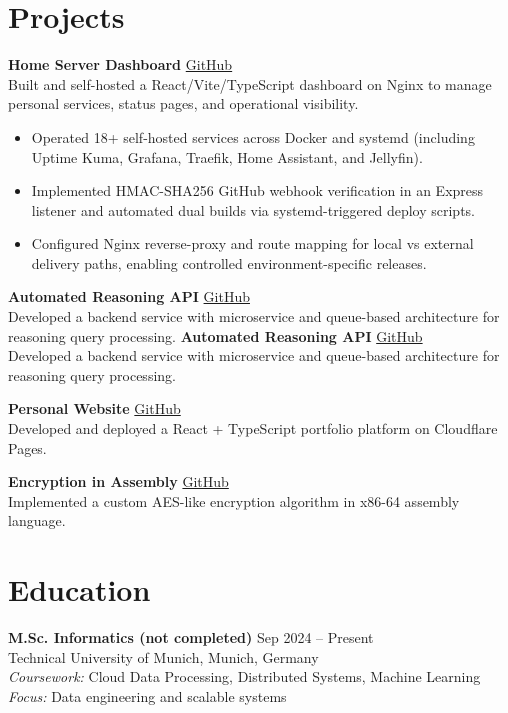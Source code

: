 \documentclass[10pt,letterpaper]{article}
\begin{document}
\section*{Projects}
\textbf{Home Server Dashboard} \hfill \href{https://github.com/giraycoskun/server.giraycoskun.dev}{GitHub} \\
Built and self-hosted a React/Vite/TypeScript dashboard on Nginx to manage personal services, status pages, and operational visibility.
\iflongcv
\begin{itemize}
  \item Operated 18+ self-hosted services across Docker and systemd (including Uptime Kuma, Grafana, Traefik, Home Assistant, and Jellyfin).
  \item Implemented HMAC-SHA256 GitHub webhook verification in an Express listener and automated dual builds via systemd-triggered deploy scripts.
  \item Configured Nginx reverse-proxy and route mapping for local vs external delivery paths, enabling controlled environment-specific releases.
\end{itemize}
\fi

\ifwithphoto
\iflongcv
\textbf{Automated Reasoning API} \hfill \href{https://github.com/giraycoskun/automated-reasoning}{GitHub} \\
Developed a backend service with microservice and queue-based architecture for reasoning query processing.
\fi
\else
\textbf{Automated Reasoning API} \hfill \href{https://github.com/giraycoskun/automated-reasoning}{GitHub} \\
Developed a backend service with microservice and queue-based architecture for reasoning query processing.
\fi

\iflongcv
\textbf{Personal Website} \hfill \href{https://github.com/giraycoskun/giraycoskun.com}{GitHub} \\
Developed and deployed a React + TypeScript portfolio platform on Cloudflare Pages.

\textbf{Encryption in Assembly} \hfill \href{https://github.com/giraycoskun/encryption-in-assembly}{GitHub} \\
Implemented a custom AES-like encryption algorithm in x86-64 assembly language.
\fi

\section*{Education}
\textbf{M.Sc. Informatics (not completed)} \hfill Sep 2024 -- Present \\
Technical University of Munich, Munich, Germany \\
\iflongcv
\textit{Coursework:} Cloud Data Processing, Distributed Systems, Machine Learning \\
\textit{Focus:} Data engineering and scalable systems
\fi
\end{document}
